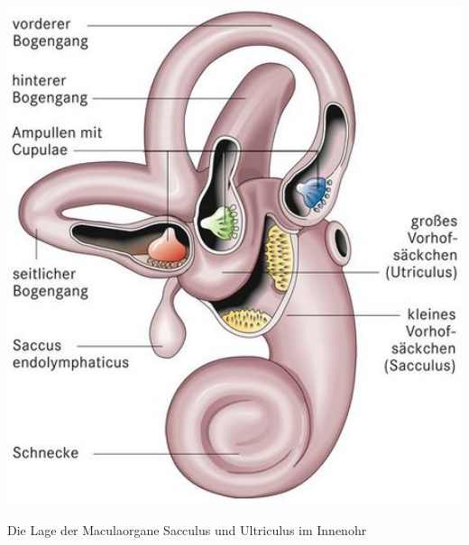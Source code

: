 \begin{marginfigure}
    \includegraphics[width=1\textwidth]{Bilder/sacculus.jpg}
    \caption{Die Lage der Maculaorgane Sacculus und Ultriculus im Innenohr}
\label{fig:sacculus}
\end{marginfigure}

